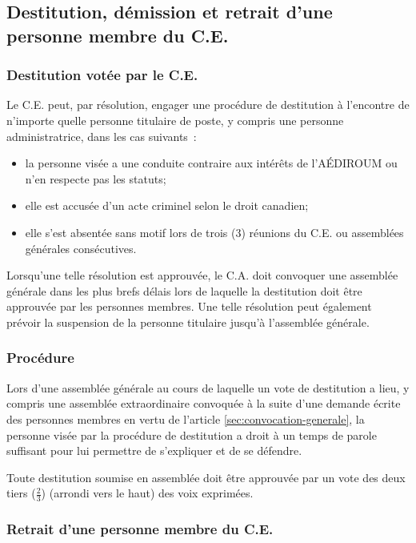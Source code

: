 \documentclass{aediroum}
\newcommand{\article}[1]{article \ref{#1}}
\begin{document}
\subsection{Destitution, démission et retrait d'une personne membre du C.E.}\label{sec:destitution-demission-retrait-exec-admin}

\subsubsection{Destitution votée par le C.E.}\label{sec:destitution}

Le C.E. peut, par résolution, engager une procédure de destitution à l'encontre de n'importe quelle personne titulaire de poste, y compris une personne administratrice, dans les cas suivants~:
\begin{itemize}
    \item la personne visée a une conduite contraire aux intérêts de l'AÉDIROUM ou n'en respecte pas les statuts;
    \item elle est accusée d'un acte criminel selon le droit canadien;
    \item elle s'est absentée sans motif lors de trois (3) réunions du C.E. ou assemblées générales consécutives.
\end{itemize}

Lorsqu'une telle résolution est approuvée, le C.A. doit convoquer une assemblée générale dans les plus brefs délais lors de laquelle la destitution doit être approuvée par les personnes membres. Une telle résolution peut également prévoir la suspension de la personne titulaire jusqu'à l'assemblée générale.

\subsubsection{Procédure}\label{sec:destitution-procedure}

Lors d'une assemblée générale au cours de laquelle un vote de destitution a lieu, y compris une assemblée extraordinaire convoquée à la suite d'une demande écrite des personnes membres en vertu de l'\article{sec:convocation-generale}, la personne visée par la procédure de destitution a droit à un temps de parole suffisant pour lui permettre de s'expliquer et de se défendre.

Toute destitution soumise en assemblée doit être approuvée par un vote des deux tiers (\( \frac{2}{3} \)) (arrondi vers le haut) des voix exprimées.

\subsubsection{Retrait d'une personne membre du C.E.}\label{sec:retrait-dun-membre-exec-admin}
\end{document}
